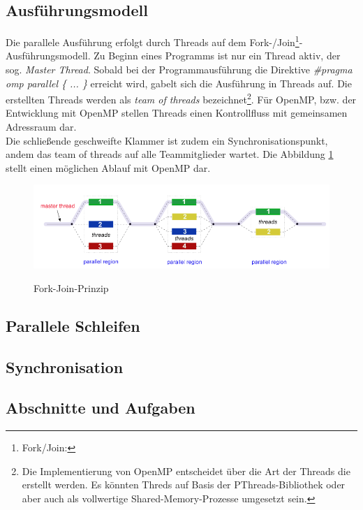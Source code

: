 \documentclass{lni}
\begin{document}
\subsection{Ausführungsmodell}
Die parallele Ausführung erfolgt durch Threads auf dem Fork-/Join\footnote{Fork/Join:}-Ausführungsmodell. Zu Beginn eines Programms ist nur ein Thread aktiv, der sog. \textit{Master Thread}. Sobald bei der Programmausführung die Direktive \textit{\#pragma omp parallel \{ ... \} } erreicht wird, gabelt sich die Ausführung in Threads auf. Die erstellten Threads werden als \textit{team of threads} bezeichnet\footnote{Die Implementierung von OpenMP entscheidet über die Art der Threads die erstellt werden. Es könnten Threds auf Basis der PThreads-Bibliothek oder aber auch als vollwertige Shared-Memory-Prozesse umgesetzt sein.}. Für OpenMP, bzw. der Entwicklung mit OpenMP stellen Threads einen Kontrollfluss mit gemeinsamen Adressraum dar.  \\ 
Die schließende geschweifte Klammer ist zudem ein Synchronisationspunkt, andem das team of threads auf alle Teammitglieder wartet. Die Abbildung \ref{Join-Fork-Modell} stellt einen möglichen Ablauf mit OpenMP dar. 

\begin{figure}[h!]
  \centering
    \includegraphics[width=1.0\textwidth]{img/fork_join.png}
    \label{Join-Fork-Modell}
   \caption{Fork-Join-Prinzip}
\end{figure}



\subsection{Parallele Schleifen}
\subsection{Synchronisation}
\subsection{Abschnitte und Aufgaben}
\end{document}

